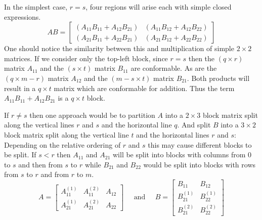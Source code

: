 In the simplest case, $r=s$, four regions will arise each with simple closed expressions. 
\begin{equation}
	AB = \begin{bmatrix}
		\left( A_{11}B_{11}+A_{12}B_{21} \right) & \left( A_{11}B_{12}+A_{12}B_{22} \right) \\ 
		\left( A_{21}B_{11}+A_{22}B_{21} \right) & \left( A_{21}B_{12}+A_{22}B_{22} \right)
	\end{bmatrix}
\end{equation}
One should notice the similarity between this and multiplication of simple $2 \times 2$ matrices.
If we consider only the top-left block, since $r=s$ then the $(q \times r)$ matrix $A_{11}$ and the 
$(s \times t)$ matrix $B_{11}$ are conformable.
As are the $(q \times m-r)$ matrix $A_{12}$ and the $(m-s \times t)$ matrix $B_{21}$.
Both products will result in a $q \times t$ matrix which are conformable for addition.
Thus the term $A_{11}B_{11} + A_{12}B_{21}$ is a $q \times t$ block. 


If $r \neq s$ then one approach would be to partition $A$ into a $2 \times 3$ block matrix 
split along the vertical lines $r$ and $s$ and the horizontal line $q$.
And split $B$ into a $3 \times 2$ block matrix split along the vertical line $t$  and the horizontal lines $r$ and $s$:
Depending on the relative ordering of $r$ and $s$ this may cause different blocks to be split.
If $s < r$ then $A_{11}$ and $A_{21}$ will be split into blocks with columns from 0 to $s$ and then from $s$ to $r$
while $B_{21}$ and $B_{22}$ would be split into blocks with rows from $s$ to $r$ and from $r$ to $m$.
\begin{equation*}
	A= \left[ \begin{array}{cc|c}
			A_{11}^{(1)} & A_{11}^{(2)} & A_{12}^{} \\ 
			\hline
			A_{21}^{(1)} & A_{21}^{(2)} & A_{22}^{}
		\end{array} \right]
	\;\;\;\;\;\text{and}\;\;\;\;\;
	B = \left[ \begin{array}{c|c}
			B_{11}^{} & B_{12}^{} \\
			\hline
			B_{21}^{(1)} & B_{22}^{(1)} \\
			B_{21}^{(2)} & B_{22}^{(2)} 
		\end{array} \right]
\end{equation*}


